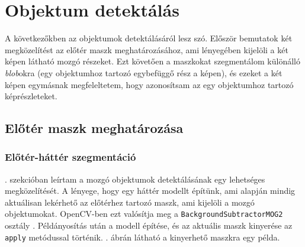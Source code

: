 \section{Objektum detektálás}

A következőkben az objektumok detektálásáról lesz szó. Először bemutatok két megközelítést az előtér maszk meghatározásához, ami lényegében kijelöli a két képen látható mozgó részeket. Ezt követően a maszkokat szegmentálom különálló \textit{blob}okra (egy objektumhoz tartozó egybefüggő rész a képen), és ezeket a két képen egymásnak megfeleltetem, hogy azonosítsam az egy objektumhoz tartozó képrészleteket.

    \subsection{Előtér maszk meghatározása}


\subsubsection{Előtér-háttér szegmentáció}

. szekcióban leírtam a mozgó objektumok detektálásának egy lehetséges megközelítését. A lényege, hogy egy háttér modellt építünk, ami alapján mindig aktuálisan lekérhető az előtérhez tartozó maszk, ami kijelöli a mozgó objektumokat. OpenCV-ben ezt valósítja meg a \texttt{BackgroundSubtractorMOG2} osztály \cite{opencv-mog}. Példányosítás után a modell építése, és az aktuális maszk kinyerése az \texttt{apply} metódussal történik. . ábrán látható a kinyerhető maszkra egy példa.

